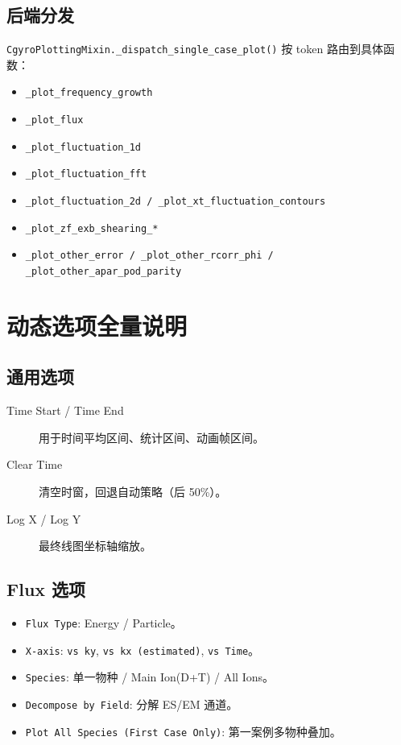 \documentclass[11pt,a4paper]{ctexart}
\begin{document}
\subsection{后端分发}
\texttt{CgyroPlottingMixin.\_dispatch\_single\_case\_plot()} 按 token 路由到具体函数：
\begin{itemize}
  \item \texttt{\_plot\_frequency\_growth}
  \item \texttt{\_plot\_flux}
  \item \texttt{\_plot\_fluctuation\_1d}
  \item \texttt{\_plot\_fluctuation\_fft}
  \item \texttt{\_plot\_fluctuation\_2d / \_plot\_xt\_fluctuation\_contours}
  \item \texttt{\_plot\_zf\_exb\_shearing\_*}
  \item \texttt{\_plot\_other\_error / \_plot\_other\_rcorr\_phi / \_plot\_other\_apar\_pod\_parity}
\end{itemize}

\section{动态选项全量说明}
\subsection{通用选项}
\begin{description}
  \item[Time Start / Time End] 用于时间平均区间、统计区间、动画帧区间。
  \item[Clear Time] 清空时窗，回退自动策略（后 50\%）。
  \item[Log X / Log Y] 最终线图坐标轴缩放。
\end{description}

\subsection{Flux 选项}
\begin{itemize}
  \item \texttt{Flux Type}: Energy / Particle。
  \item \texttt{X-axis}: \texttt{vs ky}, \texttt{vs kx (estimated)}, \texttt{vs Time}。
  \item \texttt{Species}: 单一物种 / Main Ion(D+T) / All Ions。
  \item \texttt{Decompose by Field}: 分解 ES/EM 通道。
  \item \texttt{Plot All Species (First Case Only)}: 第一案例多物种叠加。
\end{itemize}
\end{document}
